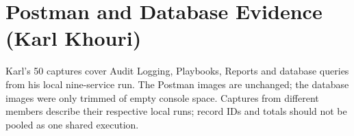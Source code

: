 \documentclass[11pt,a4paper]{article}
\begin{document}
\section{Postman and Database Evidence (Karl Khouri)}
\label{app:karl}
Karl's 50 captures cover Audit Logging, Playbooks, Reports and database queries from his local nine-service run. The Postman images are unchanged; the database images were only trimmed of empty console space. Captures from different members describe their respective local runs; record IDs and totals should not be pooled as one shared execution.
\begin{landscape}\pagestyle{plain}\end{landscape}
\end{document}
